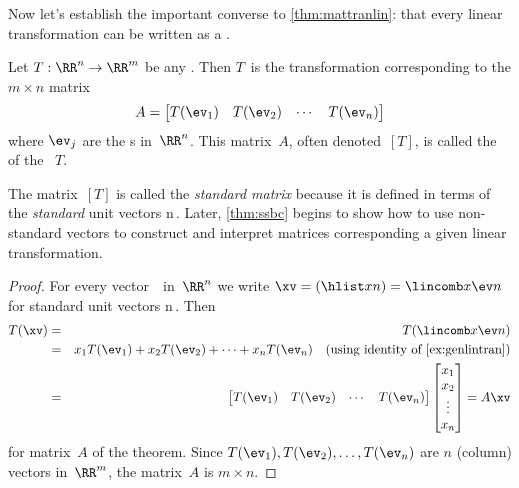 Now let's establish the important converse to \cref{thm:mattranlin}: that every linear transformation can be written as a .

\begin{theorem} \label{thm:matlintran} 
Let \(T:\RR^n\to\RR^m\) be any .
Then \(T\)~is the transformation corresponding to the \(m\times n\)  matrix
\begin{equation*}
A=\begin{bmatrix} T(\ev_1)& T(\ev_2)&\cdots&T(\ev_n) \end{bmatrix}
\end{equation*}
where \(\ev_j\) are the s in~\(\RR^n\).
This matrix~\(A\), often denoted~\([T]\), is called the  of the ~\(T\).
\end{theorem}

The matrix~\([T]\) is called the \emph{standard matrix} because it is defined in terms of the \emph{standard} unit vectors \hlist\ev n\,.
Later, \cref{thm:ssbc} begins to show how to use non-standard vectors to construct and interpret matrices corresponding a given linear transformation.

\begin{proof} 
For every vector~\xv\ in~\(\RR^n\) we write \(\xv=(\hlist xn)=\lincomb x\ev n\) for standard unit vectors \hlist\ev n\,.
Then
\begin{eqnarray*}
T(\xv)&=&T(\lincomb x\ev n)
\\&=&x_1T(\ev_1)+x_2T(\ev_2)+\cdots+x_nT(\ev_n)
\quad(\text{using identity of \cref{ex:genlintran}})
\\&=&\begin{bmatrix} T(\ev_1)& T(\ev_2)&\cdots&T(\ev_n) \end{bmatrix}
\begin{bmatrix} x_1\\x_2\\\vdots\\x_n \end{bmatrix}
=A\xv
\end{eqnarray*}
for matrix~\(A\) of the theorem.
Since \(T(\ev_1), T(\ev_2),\ldots,T(\ev_n)\) are \(n\) (column) vectors in~\(\RR^m\), the matrix~\(A\) is \(m\times n\).
\end{proof}


